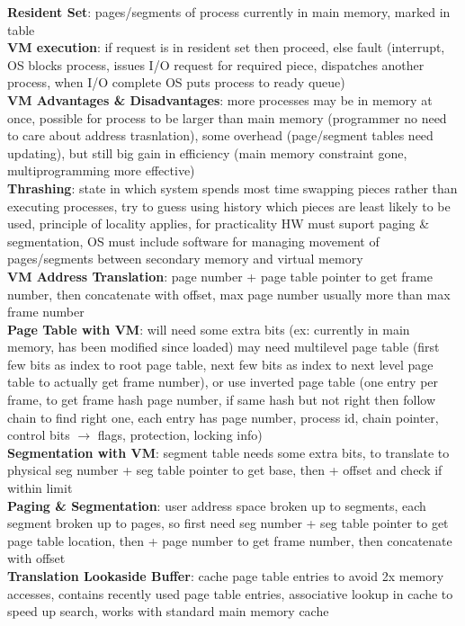 \documentclass[a4paper]{article}
\begin{document}
\begin{multicols}{2}
        \textbf{Resident Set}: pages/segments of process currently in main memory, marked in table\\
        \textbf{VM execution}: if request is in resident set then proceed, else fault (interrupt, OS blocks process, issues I/O request for required piece, dispatches another process, when I/O complete OS puts process to ready queue)\\
        \textbf{VM Advantages \& Disadvantages}: more processes may be in memory at once, possible for process to be larger than main memory (programmer no need to care about address trasnlation), some overhead (page/segment tables need updating), but still big gain in efficiency (main memory constraint gone, multiprogramming more effective)\\
        \textbf{Thrashing}: state in which system spends most time swapping pieces rather than executing processes, try to guess using history which pieces are least likely to be used, principle of locality applies, for practicality HW must suport paging \& segmentation, OS must include software for managing movement of pages/segments between secondary memory and virtual memory\\
        \textbf{VM Address Translation}: page number + page table pointer to get frame number, then concatenate with offset, max page number usually more than max frame number\\
        \textbf{Page Table with VM}: will need some extra bits (ex: currently in main memory, has been modified since loaded) may need multilevel page table (first few bits as index to root page table, next few bits as index to next level page table to actually get frame number), or use inverted page table (one entry per frame, to get frame hash page number, if same hash but not right then follow chain to find right one, each entry has page number, process id, chain pointer, control bits $\to$ flags, protection, locking info)\\
        \textbf{Segmentation with VM}: segment table needs some extra bits, to translate to physical seg number + seg table pointer to get base, then + offset and check if within limit\\
        \textbf{Paging \& Segmentation}: user address space broken up to segments, each segment broken up to pages, so first need seg number + seg table pointer to get page table location, then + page number to get frame number, then concatenate with offset\\
        \textbf{Translation Lookaside Buffer}: cache page table entries to avoid 2x memory accesses, contains recently used page table entries, associative lookup in cache to speed up search, works with standard main memory cache\\

\end{multicols}
\end{document}
